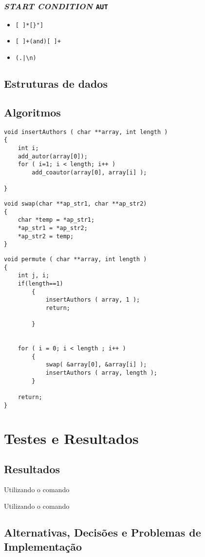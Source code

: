 \subsubsection{\emph{START CONDITION} \texttt{AUT}}

\begin{itemize}
	\item 
\begin{verbatim}
[ ]*[}"] 
\end{verbatim}

\item 
\begin{verbatim}
[ ]+(and)[ ]+
\end{verbatim}

\item 
\begin{verbatim}
(.|\n)
\end{verbatim}

\end{itemize}

\subsection{Estruturas de dados}

\subsection{Algoritmos}


\begin{Verbatim}
void insertAuthors ( char **array, int length )
{
    int i;
    add_autor(array[0]);
    for ( i=1; i < length; i++ )
        add_coautor(array[0], array[i] );
						
}
\end{Verbatim}


\begin{Verbatim}
void swap(char **ap_str1, char **ap_str2)
{
    char *temp = *ap_str1;
    *ap_str1 = *ap_str2;
    *ap_str2 = temp;
}
\end{Verbatim}


\begin{Verbatim}
void permute ( char **array, int length )
{
    int j, i;
    if(length==1)
        {
            insertAuthors ( array, 1 );
            return;

        }


    for ( i = 0; i < length ; i++ )
        {
            swap( &array[0], &array[i] );
            insertAuthors ( array, length );
        }

    return;
}
\end{Verbatim}

\section{Testes e Resultados}
\label{sec:ts:c}


\subsection{Resultados}

Utilizando o comando 


Utilizando o comando 

\subsection{Alternativas, Decisões e Problemas de Implementação}



